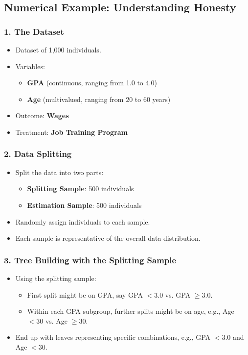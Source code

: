 \documentclass{beamer}
\begin{document}
\subsection{Numerical Example: Understanding Honesty}

\begin{frame}
\frametitle{1. The Dataset}
\begin{itemize}
    \item Dataset of 1,000 individuals.
    \item Variables:
    \begin{itemize}
        \item \textbf{GPA} (continuous, ranging from 1.0 to 4.0)
        \item \textbf{Age} (multivalued, ranging from 20 to 60 years)
    \end{itemize}
    \item Outcome: \textbf{Wages}
    \item Treatment: \textbf{Job Training Program}
\end{itemize}
\end{frame}

\begin{frame}
\frametitle{2. Data Splitting}
\begin{itemize}
    \item Split the data into two parts:
    \begin{itemize}
        \item \textbf{Splitting Sample}: 500 individuals
        \item \textbf{Estimation Sample}: 500 individuals
    \end{itemize}
    \item Randomly assign individuals to each sample.
    \item Each sample is representative of the overall data distribution.
\end{itemize}
\end{frame}

\begin{frame}
\frametitle{3. Tree Building with the Splitting Sample}
\begin{itemize}
    \item Using the splitting sample:
    \begin{itemize}
        \item First split might be on GPA, say GPA $< 3.0$ vs. GPA $\geq 3.0$.
        \item Within each GPA subgroup, further splits might be on age, e.g., Age $< 30$ vs. Age $\geq 30$.
    \end{itemize}
    \item End up with leaves representing specific combinations, e.g., GPA $< 3.0$ and Age $< 30$.
\end{itemize}
\end{frame}
\end{document}
